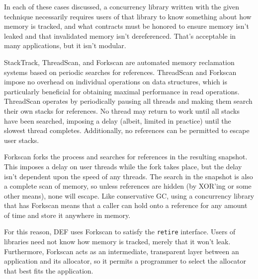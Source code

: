 In each of these cases discussed, a concurrency library written with the given technique necessarily requires users of that library to know something about how memory is tracked, and what contracts must be honored to ensure memory isn't leaked and that invalidated memory isn't dereferenced.  That's acceptable in many applications, but it isn't modular.

StackTrack\cite{StackTrack}, ThreadScan\cite{Threadscan}, and Forkscan\cite{Forkscan} are automated memory reclamation systems based on periodic searches for references.  ThreadScan and Forkscan impose no overhead on individual operations on data structures, which is particularly beneficial for obtaining maximal performance in read operations.  ThreadScan operates by periodically pausing all threads and making them search their own stacks for references.  No thread may return to work until all stacks have been searched, imposing a delay (albeit, limited in practice) until the slowest thread completes.  Additionally, no references can be permitted to escape user stacks.

Forkscan forks the process and searches for references in the resulting snapshot.  This imposes a delay on user threads while the fork takes place, but the delay isn't dependent upon the speed of any threads.  The search in the snapshot is also a complete scan of memory, so unless references are hidden (by XOR'ing or some other means), none will escape.  Like conservative GC, using a concurrency library that has Forkscan means that a caller can hold onto a reference for any amount of time and store it anywhere in memory.

For this reason, DEF uses Forkscan to satisfy the \texttt{retire} interface.  Users of libraries need not know how memory is tracked, merely that it won't leak.  Furthermore, Forkscan acts as an intermediate, transparent layer between an application and its allocator, so it permits a programmer to select the allocator that best fits the application.
